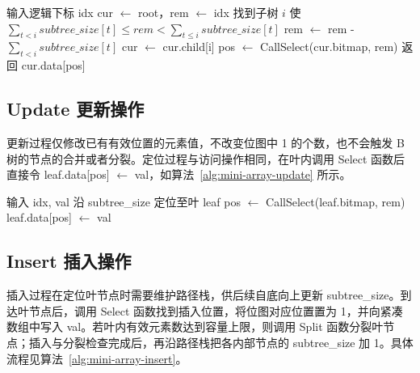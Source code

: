 \begin{algorithm}[htbp]
  \caption{mini-array.Access}
  \label{alg:mini-array-access}
  \begin{algorithmic}[1]
    \State 输入逻辑下标 idx
    \State cur $\gets$ root，rem $\gets$ idx
      \State 找到子树 $i$ 使 $\displaystyle\sum_{t<i}\mathit{subtree\_size}[t]\le \mathit{rem}<\sum_{t\le i}\mathit{subtree\_size}[t]$
      \State rem $\gets$ rem - $\displaystyle\sum_{t<i}\mathit{subtree\_size}[t]$
      \State cur $\gets$ cur.child[i]
    \EndWhile
    \State pos $\gets$ Call{Select}(cur.bitmap, rem)
    \State 返回 cur.data[pos]
  \end{algorithmic}
\end{algorithm}

\subsection{Update 更新操作}

更新过程仅修改已有有效位置的元素值，不改变位图中 1 的个数，也不会触发 B 树的节点的合并或者分裂。定位过程与访问操作相同，在叶内调用 Select 函数后直接令 leaf.data[pos] $\gets$ val，如算法~\ref{alg:mini-array-update} 所示。

\begin{algorithm}[htbp]
  \caption{mini-array.Update}
  \label{alg:mini-array-update}
  \begin{algorithmic}[1]
    \State 输入 idx, val
    \State 沿 subtree\_size 定位至叶 leaf
    \State pos $\gets$ Call{Select}(leaf.bitmap, rem)
    \State leaf.data[pos] $\gets$ val
  \end{algorithmic}
\end{algorithm}

\subsection{Insert 插入操作}

插入过程在定位叶节点时需要维护路径栈，供后续自底向上更新 subtree\_size。到达叶节点后，调用 Select 函数找到插入位置，将位图对应位置置为 1，并向紧凑数组中写入 val。若叶内有效元素数达到容量上限，则调用 Split 函数分裂叶节点；插入与分裂检查完成后，再沿路径栈把各内部节点的 subtree\_size 加 1。具体流程见算法~\ref{alg:mini-array-insert}。

